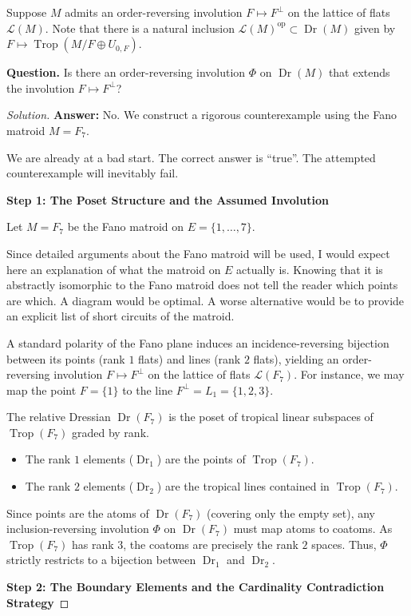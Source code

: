 \documentclass[12pt]{article}
\DeclareMathOperator{\Trop}{Trop}
\DeclareMathOperator{\Dr}{Dr}
\newcommand{\cLL}{\mathcal{L}}
\newcommand{\op}{\mathrm{op}}
\newcommand{\review}[1]{\begin{reviewbox}#1\end{reviewbox}}
\begin{document}
Suppose $M$ admits an order-reversing involution $F\mapsto F^\perp$ on the lattice of flats $\cLL(M)$. Note that there is a natural inclusion $\cLL(M)^{\op} \subset \Dr(M)$ given by $F\mapsto \Trop(M/F\oplus U_{0,F})$.

\medskip
\noindent \textbf{Question.} Is there an order-reversing involution $\Phi$ on $\Dr(M)$ that extends the involution $F\mapsto F^\perp$?

\bigskip

\begin{proof}[Solution]
\textbf{Answer:} No. We construct a rigorous counterexample using the Fano matroid $M = F_7$.
\review{We are already at a bad start. The correct answer is ``true''. The attempted counterexample will inevitably fail.}

\medskip
\noindent \textbf{Step 1: The Poset Structure and the Assumed Involution}

Let $M = F_7$ be the Fano matroid on $E = \{1, \dots, 7\}$.\review{Since detailed arguments about the Fano matroid will be used, I would expect here an explanation of what the matroid on $E$ actually is. Knowing that it is abstractly isomorphic to the Fano matroid does not tell the reader which points are which. A diagram would be optimal. A worse alternative would be to provide an explicit list of short circuits of the matroid.}
A standard polarity of the Fano plane induces an incidence-reversing bijection between its points (rank $1$ flats) and lines (rank $2$ flats), yielding an order-reversing involution $F \mapsto F^\perp$ on the lattice of flats $\cLL(F_7)$. For instance, we may map the point $F = \{1\}$ to the line $F^\perp = L_1 = \{1,2,3\}$.

The relative Dressian $\Dr(F_7)$ is the poset of tropical linear subspaces of $\Trop(F_7)$ graded by rank. 
\begin{itemize}
    \item The rank $1$ elements ($\Dr_1$) are the points of $\Trop(F_7)$.
    \item The rank $2$ elements ($\Dr_2$) are the tropical lines contained in $\Trop(F_7)$.
\end{itemize}
Since points are the atoms of $\Dr(F_7)$ (covering only the empty set), any inclusion-reversing involution $\Phi$ on $\Dr(F_7)$ must map atoms to coatoms. As $\Trop(F_7)$ has rank $3$, the coatoms are precisely the rank $2$ spaces. Thus, $\Phi$ strictly restricts to a bijection between $\Dr_1$ and $\Dr_2$.

\medskip
\noindent \textbf{Step 2: The Boundary Elements and the Cardinality Contradiction Strategy}


\end{proof}
\end{document}
